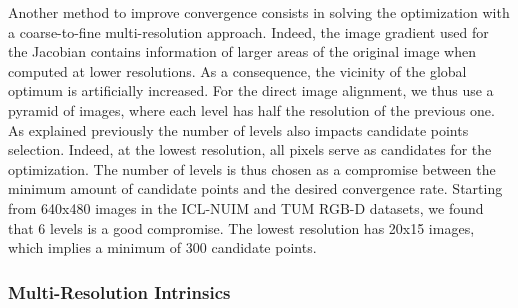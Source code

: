 Another method to improve convergence consists in solving the optimization
with a coarse-to-fine multi-resolution approach.
Indeed, the image gradient used for the Jacobian contains information
of larger areas of the original image when computed at lower resolutions.
As a consequence, the vicinity of the global optimum is artificially increased.
For the direct image alignment, we thus use a pyramid of images,
where each level has half the resolution of the previous one.
As explained previously the number of levels also impacts candidate points selection.
Indeed, at the lowest resolution, all pixels serve as candidates for the optimization.
The number of levels is thus chosen as a compromise between the minimum amount
of candidate points and the desired convergence rate.
Starting from 640x480 images in the ICL-NUIM and TUM RGB-D datasets,
we found that 6 levels is a good compromise.
The lowest resolution has 20x15 images, which implies a minimum of 300 candidate points.

\subsubsection{Multi-Resolution Intrinsics}%
\label{ssub:multires-intrinsics}

